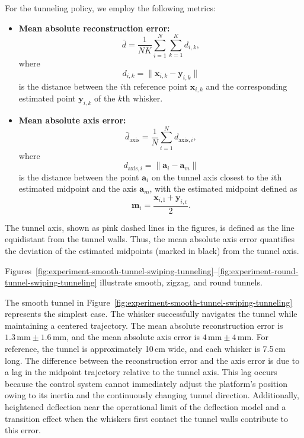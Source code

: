 For the tunneling policy, we employ the following metrics:

\begin{itemize}
    \item \textbf{Mean absolute reconstruction error:}
    \[
        \bar{d} = \frac{1}{NK}\sum_{i=1}^{N}\sum_{k=1}^{K} d_{i,k},
    \]
    where
    \[
        d_{i,k} = \|\mathbf{x}_{i,k} - \mathbf{y}_{i,k}\|
    \]
    is the distance between the $i$th reference point $\mathbf{x}_{i,k}$ and the corresponding estimated point $\mathbf{y}_{i,k}$ of the $k$th whisker.
    \item \textbf{Mean absolute axis error:}
    \[
        \bar{d}_{\mathrm{axis}} = \frac{1}{N}\sum_{i=1}^{N} d_{\mathrm{axis},i},
    \]
    where
    \[
        d_{\mathrm{axis},i} = \|\mathbf{a}_i - \mathbf{a}_m\|
    \]
    is the distance between the point $\mathbf{a}_i$ on the tunnel axis closest to the $i$th estimated midpoint and the axis $\mathbf{a}_m$, with the estimated midpoint defined as
    \[
        \mathbf{m}_i = \frac{\mathbf{x}_{i,\mathrm{l}} + \mathbf{y}_{i,\mathrm{r}}}{2}.
    \]
\end{itemize}

The tunnel axis, shown as pink dashed lines in the figures, is defined as the line equidistant from the tunnel walls.
Thus, the mean absolute axis error quantifies the deviation of the estimated midpoints (marked in black) from the tunnel axis.

Figures~\ref{fig:experiment-smooth-tunnel-swiping-tunneling}--\ref{fig:experiment-round-tunnel-swiping-tunneling} illustrate smooth, zigzag, and round tunnels.

The smooth tunnel in Figure~\ref{fig:experiment-smooth-tunnel-swiping-tunneling} represents the simplest case.
The whisker successfully navigates the tunnel while maintaining a centered trajectory.
The mean absolute reconstruction error is $1.3\,\text{mm} \pm 1.6\,\text{mm}$, and the mean absolute axis error is $4\,\text{mm} \pm 4\,\text{mm}$.
For reference, the tunnel is approximately 10\,cm wide, and each whisker is 7.5\,cm long.
The difference between the reconstruction error and the axis error is due to a lag in the midpoint trajectory relative to the tunnel axis.
This lag occurs because the control system cannot immediately adjust the platform’s position owing to its inertia and the continuously changing tunnel direction.
Additionally, heightened deflection near the operational limit of the deflection model and a transition effect when the whiskers first contact the tunnel walls contribute to this error.

